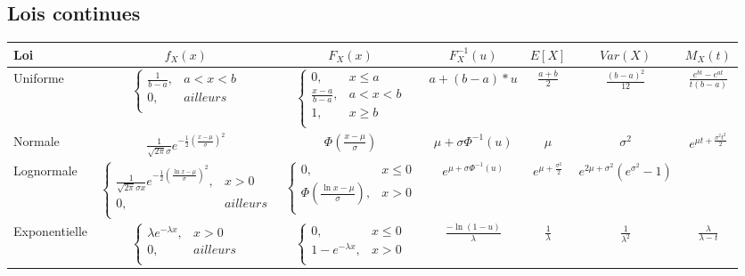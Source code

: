 \documentclass[10pt, french]{article}
\begin{document}
\subsection{Lois continues}
\begin{tabularx}{\textwidth}{ | Y | c | c | c | c | c | c  |}
\hline
  \textbf{Loi} & $f_X(x)$  & $F_X (x)$ & $F_X^{-1}(u)$ & $E[X]$ & $Var(X)$ & $M_X(t)$ \\
\hline
\hline

  Uniforme & $
    \left\{
    	\begin{array}{ll}
    		\frac{1}{b - a}, &  a < x < b \\
    		0,  &  ailleurs \\
    	\end{array}
    \right.
    $ & $
	\left\{
    	\begin{array}{ll}
		0, & x \le a \\
		\frac{x - a}{b - a }, &  a < x < b \\
    		1,  &  x \ge b \\
    	\end{array}
    \right.$
	& $ a + (b -a) * u$
	& $\frac{a+b}{2}$
	& $\frac{(b-a)^2}{12}$
	& $\frac{e^{bt} - e^{at}}{t(b -a)}$ \\ 
\hline

Normale  
 & $\frac{1}{\sqrt{2 \pi} \sigma} e^{-\frac{1}{2} \left(\frac{x-\mu}{\sigma}\right)^2} $ &
$\Phi\left(\frac{x-\mu}{\sigma}\right)$ &
$\mu +\sigma \Phi^{-1}(u)$ &
$\mu$ &
$\sigma^2$ &
$e^{\mu t + \frac{\sigma^2 t^2}{2}} $ \\
\hline

Lognormale & $
    \left\{
    	\begin{array}{ll}
    		\frac{1}{\sqrt{2 \pi} \sigma x} e^{-\frac{1}{2} \left(\frac{\ln x-\mu}{\sigma}\right)^2}, &  x > 0 \\
    		0,  &  ailleurs \\
    	\end{array}
    \right.
    $ & $  
	\left\{
    	\begin{array}{ll}
		0, & x \le 0 \\
		\Phi\left(\frac{\ln x-\mu}{\sigma}\right), &  x > 0\\
    	\end{array}
    \right.
 $ &
$e^{\mu +\sigma \Phi^{-1}(u)}$ &
$e^{\mu + \frac{\sigma^2}{2}} $ &
$e^{2 \mu + \sigma^2}\left(e^{\sigma^2}-1\right)$ & \\
\hline

Exponentielle & $
 \left\{
    	\begin{array}{ll}
    		\lambda e^{-\lambda x}, &  x > 0 \\
    		0,  &  ailleurs \\
    	\end{array}
    \right.
    $& $
	\left\{
    	\begin{array}{ll}
		0, & x \le 0 \\
		1 - e^{-\lambda x}, &  x > 0 \\
    	\end{array}
    \right.$
	& $ \frac{-\ln (1-u)}{\lambda}$
	& $\frac{1}{\lambda}$
	& $\frac{1}{\lambda^2}$
	& $\frac{\lambda}{\lambda - t}$ \\ 
\hline


\end{tabularx}
\end{document}

